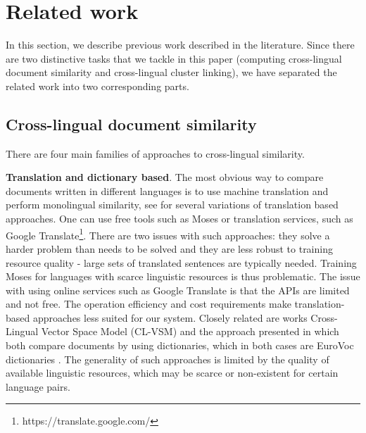 \documentclass[twoside,11pt]{article}
\begin{document}
\section{Related work}

In this section, we describe previous work described  in the literature. Since there are two distinctive tasks that we tackle in this paper (computing cross-lingual document similarity and cross-lingual cluster linking), we have separated the related work into two corresponding parts.

\subsection{Cross-lingual document similarity}

There are four main families of approaches to cross-lingual similarity.

\textbf{Translation and dictionary based}. The most obvious way to compare documents written in different languages is to use machine translation and perform monolingual similarity, see  \cite{multilingualBook}\cite{plagiarism} for several variations of translation based approaches. One can use free tools such as Moses  or translation services, such as Google Translate\footnote{https://translate.google.com/}. There are two issues with such approaches: they solve a harder problem than needs to be solved and they are less robust to training resource quality - large sets of translated sentences are typically needed. Training Moses for languages with scarce linguistic resources is thus problematic. The issue with using online services such as Google Translate is that the APIs are limited and not free. The operation efficiency and cost requirements make translation-based approaches less suited for our system. Closely related are works Cross-Lingual Vector Space Model (CL-VSM) \cite{plagiarism} and the approach presented in \cite{pouliquen2008story} which both compare documents by using dictionaries, which in both cases are EuroVoc dictionaries \cite{eurovoc}. The generality of such approaches is limited by the quality of available linguistic resources, which may be scarce or non-existent for certain language pairs.
\end{document}
